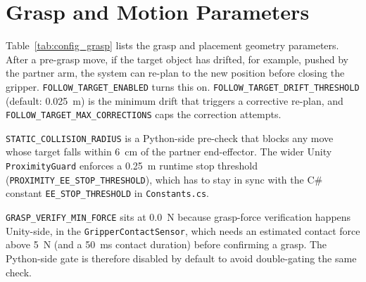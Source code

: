 \section{Grasp and Motion Parameters}\label{appendix:config:grasp}
Table~\ref{tab:config_grasp} lists the grasp and placement geometry parameters. After a pre-grasp move, if the target object has drifted, for example, pushed by the partner arm, the system can re-plan to the new position before closing the gripper. \texttt{FOLLOW\_TARGET\_ENABLED} turns this on. \texttt{FOLLOW\_TARGET\_DRIFT\_THRESHOLD} (default: 0.025~m) is the minimum drift that triggers a corrective re-plan, and \texttt{FOLLOW\_TARGET\_MAX\_CORRECTIONS} caps the correction attempts.

\texttt{STATIC\_COLLISION\_RADIUS} is a Python-side pre-check that blocks any move whose target falls within 6~cm of the partner end-effector. The wider Unity \texttt{ProximityGuard} enforces a 0.25~m runtime stop threshold (\texttt{PROXIMITY\_EE\_STOP\_THRESHOLD}), which has to stay in sync with the C\# constant \texttt{EE\_STOP\_THRESHOLD} in \texttt{Constants.cs}.

\texttt{GRASP\_VERIFY\_MIN\_FORCE} sits at 0.0~N because grasp-force verification happens Unity-side, in the \texttt{GripperContactSensor}, which needs an estimated contact force above 5~N (and a 50~ms contact duration) before confirming a grasp. The Python-side gate is therefore disabled by default to avoid double-gating the same check.

